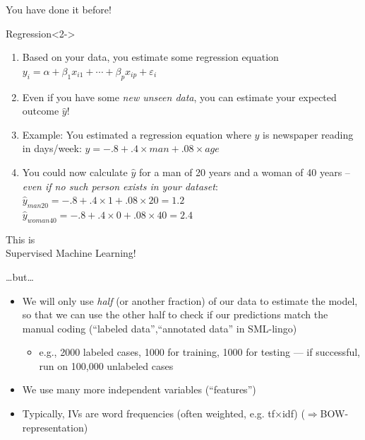 \documentclass[compress]{beamer}
\begin{document}
\begin{frame}{You have done it before!}
	\begin{block}{Regression}<2->
		\begin{enumerate}
			\item<3-> Based on your data, you estimate some regression equation 	$y_i = \alpha + \beta_1 x_{i1} + \cdots + \beta_p x_{ip} + \varepsilon_i$
			\item<4-> Even if you have some \emph{new unseen data}, you can estimate your expected outcome $\hat{y}$!
			\item<5-> Example: You estimated a regression equation where $y$ is newspaper reading in days/week: $y = -.8 + .4 \times man + .08 \times age$
			\item<6-> You could now calculate $\hat{y}$ for a man of 20 years and a woman of 40 years -- \emph{even if no such person exists in your dataset}: \\
			$\hat{y}_{man20} = -.8 + .4 \times 1 + .08 \times 20 = 1.2$ \\
			$\hat{y}_{woman40} = -.8 + .4 \times 0 + .08 \times 40 = 2.4$
		\end{enumerate}
	\end{block}	
\end{frame}

\begin{frame}{}
	\huge{This is\\ Supervised Machine Learning!}
\end{frame}

\begin{frame}{\ldots but\ldots}
	\begin{itemize}
		\item<1-> We will only use \emph{half} {\tiny{(or another fraction)}} of our data to estimate the model, so that we can use the other half to check if our predictions match the manual coding (``labeled data'',``annotated data'' in SML-lingo)
		\begin{itemize}
			\item<2->e.g., 2000 labeled cases, 1000 for training, 1000 for testing --- if successful, run on 100,000 unlabeled cases
		\end{itemize}
		\item<3-> We use many more independent variables (``features'')
		\item<4-> Typically, IVs are word frequencies (often weighted, e.g. tf$\times$idf) ($\Rightarrow$BOW-representation)
	\end{itemize}
\end{frame}
\end{document}
